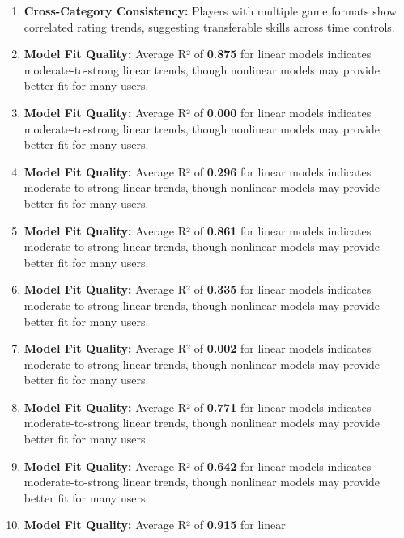 \documentclass[
]{article}
\providecommand{\tightlist}{%
  \setlength{\itemsep}{0pt}\setlength{\parskip}{0pt}}
\begin{document}
\begin{enumerate}
  \begin{itemize}
  \tightlist
  \item
    Initial rapid improvement (steep slope in first 10-20 weeks)
  \item
    Gradual plateauing as ratings converge to skill ceiling
  \item
    Periodic fluctuations correlating with activity levels
  \end{itemize}
\item
  \textbf{Cross-Category Consistency:} Players with multiple game
  formats show correlated rating trends, suggesting transferable skills
  across time controls.
\item
  \textbf{Model Fit Quality:} Average R² of \textbf{0.875} for linear
  models indicates moderate-to-strong linear trends, though nonlinear
  models may provide better fit for many users.
\item
  \textbf{Model Fit Quality:} Average R² of \textbf{0.000} for linear
  models indicates moderate-to-strong linear trends, though nonlinear
  models may provide better fit for many users.
\item
  \textbf{Model Fit Quality:} Average R² of \textbf{0.296} for linear
  models indicates moderate-to-strong linear trends, though nonlinear
  models may provide better fit for many users.
\item
  \textbf{Model Fit Quality:} Average R² of \textbf{0.861} for linear
  models indicates moderate-to-strong linear trends, though nonlinear
  models may provide better fit for many users.
\item
  \textbf{Model Fit Quality:} Average R² of \textbf{0.335} for linear
  models indicates moderate-to-strong linear trends, though nonlinear
  models may provide better fit for many users.
\item
  \textbf{Model Fit Quality:} Average R² of \textbf{0.002} for linear
  models indicates moderate-to-strong linear trends, though nonlinear
  models may provide better fit for many users.
\item
  \textbf{Model Fit Quality:} Average R² of \textbf{0.771} for linear
  models indicates moderate-to-strong linear trends, though nonlinear
  models may provide better fit for many users.
\item
  \textbf{Model Fit Quality:} Average R² of \textbf{0.642} for linear
  models indicates moderate-to-strong linear trends, though nonlinear
  models may provide better fit for many users.
\item
  \textbf{Model Fit Quality:} Average R² of \textbf{0.915} for linear

\end{enumerate}
\end{document}
